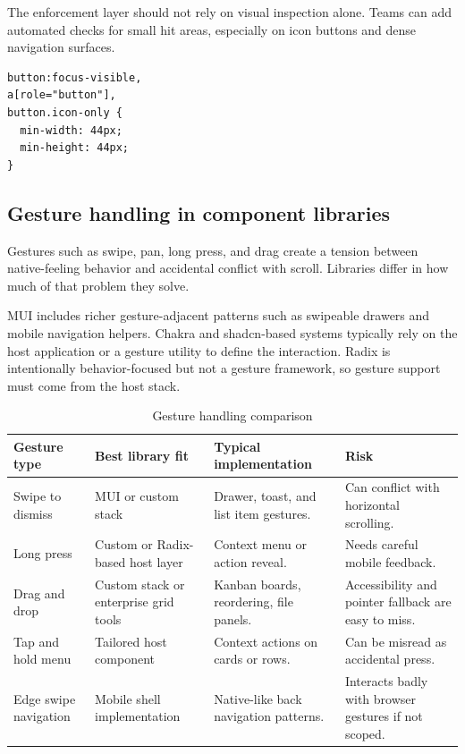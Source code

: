 The enforcement layer should not rely on visual inspection alone. Teams can add automated checks for small hit areas, especially on icon buttons and dense navigation surfaces.

\begin{verbatim}
button:focus-visible,
a[role="button"],
button.icon-only {
  min-width: 44px;
  min-height: 44px;
}
\end{verbatim}

\subsection{Gesture handling in component libraries}
Gestures such as swipe, pan, long press, and drag create a tension between native-feeling behavior and accidental conflict with scroll. Libraries differ in how much of that problem they solve.

MUI includes richer gesture-adjacent patterns such as swipeable drawers and mobile navigation helpers. Chakra and shadcn-based systems typically rely on the host application or a gesture utility to define the interaction. Radix is intentionally behavior-focused but not a gesture framework, so gesture support must come from the host stack.

\begin{table}[htbp]
  \centering
  \caption{Gesture handling comparison}
  \begin{tabularx}{\textwidth}{@{}p{}p{}p{}Y@{}}
    \toprule
    \textbf{Gesture type} & \textbf{Best library fit} & \textbf{Typical implementation} & \textbf{Risk} \\
    \midrule
    Swipe to dismiss & MUI or custom stack & Drawer, toast, and list item gestures. & Can conflict with horizontal scrolling. \\
    Long press & Custom or Radix-based host layer & Context menu or action reveal. & Needs careful mobile feedback. \\
    Drag and drop & Custom stack or enterprise grid tools & Kanban boards, reordering, file panels. & Accessibility and pointer fallback are easy to miss. \\
    Tap and hold menu & Tailored host component & Context actions on cards or rows. & Can be misread as accidental press. \\
    Edge swipe navigation & Mobile shell implementation & Native-like back navigation patterns. & Interacts badly with browser gestures if not scoped. \\
    \bottomrule
  \end{tabularx}
\end{table}

